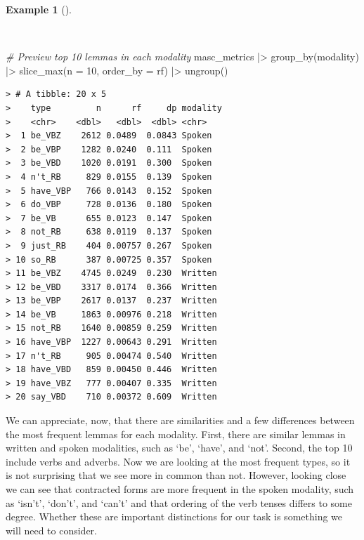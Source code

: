 \documentclass[
  letterpaper,
]{latex/krantz}
\newenvironment{Shaded}{\begin{snugshade}}{\end{snugshade}}
\newcommand{\AttributeTok}[1]{\textcolor[rgb]{0.00,0.00,0.00}{#1}}
\newcommand{\CommentTok}[1]{\textcolor[rgb]{0.00,0.00,0.00}{\textit{#1}}}
\newcommand{\DecValTok}[1]{\textcolor[rgb]{0.00,0.00,0.00}{#1}}
\newcommand{\FunctionTok}[1]{\textcolor[rgb]{0.00,0.00,0.00}{#1}}
\newcommand{\NormalTok}[1]{\textcolor[rgb]{0.00,0.00,0.00}{#1}}
\newcommand{\SpecialCharTok}[1]{\textcolor[rgb]{0.00,0.00,0.00}{#1}}
\theoremstyle{definition}
\newtheorem{example}{Example}[chapter]
\theoremstyle{remark}
\begin{document}
\begin{example}[]\protect\hypertarget{exm-eda-masc-relative-frequency-top}{}\label{exm-eda-masc-relative-frequency-top}

~

\begin{Shaded}
\begin{Highlighting}[]
\CommentTok{\# Preview top 10 lemmas in each modality}
\NormalTok{masc\_metrics }\SpecialCharTok{|\textgreater{}}
  \FunctionTok{group\_by}\NormalTok{(modality) }\SpecialCharTok{|\textgreater{}}
  \FunctionTok{slice\_max}\NormalTok{(}\AttributeTok{n =} \DecValTok{10}\NormalTok{, }\AttributeTok{order\_by =}\NormalTok{ rf) }\SpecialCharTok{|\textgreater{}}
  \FunctionTok{ungroup}\NormalTok{()}
\end{Highlighting}
\end{Shaded}

\begin{verbatim}
> # A tibble: 20 x 5
>    type         n      rf     dp modality
>    <chr>    <dbl>   <dbl>  <dbl> <chr>   
>  1 be_VBZ    2612 0.0489  0.0843 Spoken  
>  2 be_VBP    1282 0.0240  0.111  Spoken  
>  3 be_VBD    1020 0.0191  0.300  Spoken  
>  4 n't_RB     829 0.0155  0.139  Spoken  
>  5 have_VBP   766 0.0143  0.152  Spoken  
>  6 do_VBP     728 0.0136  0.180  Spoken  
>  7 be_VB      655 0.0123  0.147  Spoken  
>  8 not_RB     638 0.0119  0.137  Spoken  
>  9 just_RB    404 0.00757 0.267  Spoken  
> 10 so_RB      387 0.00725 0.357  Spoken  
> 11 be_VBZ    4745 0.0249  0.230  Written 
> 12 be_VBD    3317 0.0174  0.366  Written 
> 13 be_VBP    2617 0.0137  0.237  Written 
> 14 be_VB     1863 0.00976 0.218  Written 
> 15 not_RB    1640 0.00859 0.259  Written 
> 16 have_VBP  1227 0.00643 0.291  Written 
> 17 n't_RB     905 0.00474 0.540  Written 
> 18 have_VBD   859 0.00450 0.446  Written 
> 19 have_VBZ   777 0.00407 0.335  Written 
> 20 say_VBD    710 0.00372 0.609  Written
\end{verbatim}

\end{example}

We can appreciate, now, that there are similarities and a few
differences between the most frequent lemmas for each modality. First,
there are similar lemmas in written and spoken modalities, such as `be',
`have', and `not'. Second, the top 10 include verbs and adverbs. Now we
are looking at the most frequent types, so it is not surprising that we
see more in common than not. However, looking close we can see that
contracted forms are more frequent in the spoken modality, such as
`isn't', `don't', and `can't' and that ordering of the verb tenses
differs to some degree. Whether these are important distinctions for our
task is something we will need to consider.
\end{document}
